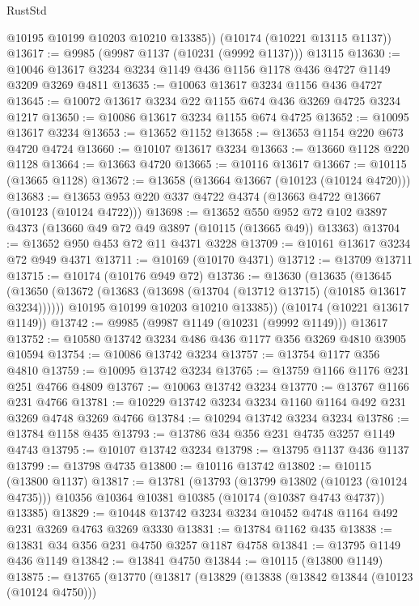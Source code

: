 \begin{lexlean}{RustStd}
\begin{coremodule}
        @10195
        @10199
        @10203
        @10210
        @13385))
    (@10174 (@10221 @13115 @1137))
@13617 := @9985 (@9987 @1137 (@10231 (@9992 @1137))) @13115
@13630 := @10046 @13617 @3234 @3234 @1149 @436 @1156 @1178 @436 @4727 @1149 @3209 @3269 @4811
@13635 := @10063 @13617 @3234 @1156 @436 @4727
@13645 := @10072 @13617 @3234 @22 @1155 @674 @436 @3269 @4725 @3234 @1217
@13650 := @10086 @13617 @3234 @1155 @674 @4725
@13652 := @10095 @13617 @3234
@13653 := @13652 @1152
@13658 := @13653 @1154 @220 @673 @4720 @4724
@13660 := @10107 @13617 @3234
@13663 := @13660 @1128 @220 @1128
@13664 := @13663 @4720
@13665 := @10116 @13617
@13667 := @10115 (@13665 @1128)
@13672 := @13658 (@13664 @13667 (@10123 (@10124 @4720)))
@13683 := @13653 @953 @220 @337 @4722 @4374 (@13663 @4722 @13667 (@10123 (@10124 @4722)))
@13698 := @13652
    @550
    @952
    @72
    @102
    @3897
    @4373
    (@13660 @49 @72 @49 @3897 (@10115 (@13665 @49)) @13363)
@13704 := @13652 @950 @453 @72 @11 @4371 @3228
@13709 := @10161 @13617 @3234 @72 @949 @4371
@13711 := @10169 (@10170 @4371)
@13712 := @13709 @13711
@13715 := @10174 (@10176 @949 @72)
@13736 := @13630
    (@13635
      (@13645
        (@13650 (@13672 (@13683 (@13698 (@13704 (@13712 @13715) (@10185 @13617 @3234))))))
        @10195
        @10199
        @10203
        @10210
        @13385))
    (@10174 (@10221 @13617 @1149))
@13742 := @9985 (@9987 @1149 (@10231 (@9992 @1149))) @13617
@13752 := @10580 @13742 @3234 @486 @436 @1177 @356 @3269 @4810 @3905 @10594
@13754 := @10086 @13742 @3234
@13757 := @13754 @1177 @356 @4810
@13759 := @10095 @13742 @3234
@13765 := @13759 @1166 @1176 @231 @251 @4766 @4809
@13767 := @10063 @13742 @3234
@13770 := @13767 @1166 @231 @4766
@13781 := @10229 @13742 @3234 @3234 @1160 @1164 @492 @231 @3269 @4748 @3269 @4766
@13784 := @10294 @13742 @3234 @3234
@13786 := @13784 @1158 @435
@13793 := @13786 @34 @356 @231 @4735 @3257 @1149 @4743
@13795 := @10107 @13742 @3234
@13798 := @13795 @1137 @436 @1137
@13799 := @13798 @4735
@13800 := @10116 @13742
@13802 := @10115 (@13800 @1137)
@13817 := @13781
    (@13793
      (@13799 @13802 (@10123 (@10124 @4735)))
      @10356
      @10364
      @10381
      @10385
      (@10174 (@10387 @4743 @4737))
      @13385)
@13829 := @10448 @13742 @3234 @3234 @10452 @4748 @1164 @492 @231 @3269 @4763 @3269 @3330
@13831 := @13784 @1162 @435
@13838 := @13831 @34 @356 @231 @4750 @3257 @1187 @4758
@13841 := @13795 @1149 @436 @1149
@13842 := @13841 @4750
@13844 := @10115 (@13800 @1149)
@13875 := @13765
    (@13770
      (@13817
        (@13829
          (@13838
            (@13842 @13844 (@10123 (@10124 @4750)))

\end{coremodule}
\end{lexlean}
